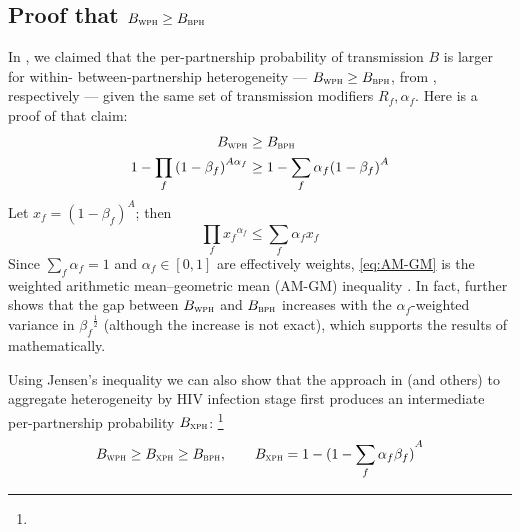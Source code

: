 \subsection{Proof that $B_{\textsc{wph}} \ge B_{\textsc{bph}}$}\label{sr.foi.proof}
In , we claimed that
the per-partnership probability of transmission $B$ is larger for
within- \vs between-partnership heterogeneity
--- $B_{\textsc{wph}} \ge B_{\textsc{bph}}$, from , respectively ---
given the same set of transmission modifiers $R_f, \alpha_f$.
Here is a proof of that claim:
\begin{equation}
  \begin{aligned}
    B_{\textsc{wph}} &\ge B_{\textsc{bph}} \\
    1 - \prod_f {(1 - \beta_f)}^{A\alpha_f} &\ge 1 - \sum_f \alpha_f {(1 - \beta_f)}^{A}
  \end{aligned}
\end{equation}
Let $x_f = {(1 - \beta_f)}^A$; then
\begin{equation}\label{eq:AM-GM}
  \prod_f {x_f}^{\alpha_f} \le \sum_f \alpha_f x_f
\end{equation}
Since $\sum_f \alpha_f = 1$ and $\alpha_f \in [0,1]$ are effectively weights,
\eqref{eq:AM-GM} is the weighted arithmetic mean--geometric mean (AM-GM) inequality \cite{Aldaz2009}.
In fact, \citet{Aldaz2009} further shows that the gap between $B_{\textsc{wph}}$ and $B_{\textsc{bph}}$
increases with the $\alpha_f$-weighted variance in ${\beta_f}^{\frac12}$
(although the increase is not exact),
which supports the results of  mathematically.
\par
Using Jensen's inequality \cite{Jensen1906} we can also show that
the approach in \cite{Kerr2015} (and others)
to aggregate heterogeneity by HIV infection stage first
produces an intermediate per-partnership probability $B_{\textsc{xph}}$:%
\footnote{}
\begin{equation}
  B_{\textsc{wph}} \ge B_{\textsc{xph}} \ge B_{\textsc{bph}},
  \qquad B_{\textsc{xph}} = 1 - {(1 - \sum_f \alpha_f \beta_f)}^{A}
\end{equation}
